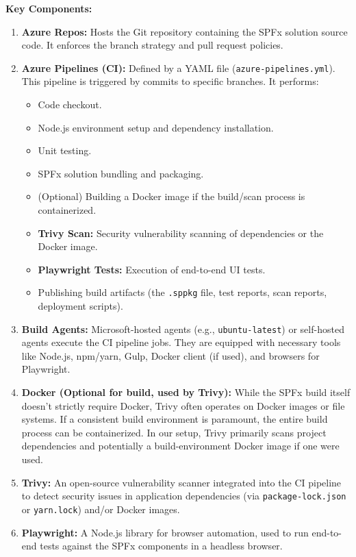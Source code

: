 \textbf{Key Components:}
\begin{enumerate}
    \item \textbf{Azure Repos:} Hosts the Git repository containing the SPFx solution source code. It enforces the branch strategy and pull request policies.
    \item \textbf{Azure Pipelines (CI):} Defined by a YAML file (\texttt{azure-pipelines.yml}). This pipeline is triggered by commits to specific branches. It performs:
    \begin{itemize}
        \item Code checkout.
        \item Node.js environment setup and dependency installation.
        \item Unit testing.
        \item SPFx solution bundling and packaging.
        \item (Optional) Building a Docker image if the build/scan process is containerized.
        \item \textbf{Trivy Scan:} Security vulnerability scanning of dependencies or the Docker image.
        \item \textbf{Playwright Tests:} Execution of end-to-end UI tests.
        \item Publishing build artifacts (the \texttt{.sppkg} file, test reports, scan reports, deployment scripts).
    \end{itemize}
    \item \textbf{Build Agents:} Microsoft-hosted agents (e.g., \texttt{ubuntu-latest}) or self-hosted agents execute the CI pipeline jobs. They are equipped with necessary tools like Node.js, npm/yarn, Gulp, Docker client (if used), and browsers for Playwright.
    \item \textbf{Docker (Optional for build, used by Trivy):} While the SPFx build itself doesn't strictly require Docker, Trivy often operates on Docker images or file systems. If a consistent build environment is paramount, the entire build process can be containerized. In our setup, Trivy primarily scans project dependencies and potentially a build-environment Docker image if one were used.
    \item \textbf{Trivy:} An open-source vulnerability scanner integrated into the CI pipeline to detect security issues in application dependencies (via \texttt{package-lock.json} or \texttt{yarn.lock}) and/or Docker images.
    \item \textbf{Playwright:} A Node.js library for browser automation, used to run end-to-end tests against the SPFx components in a headless browser.

\end{enumerate}
